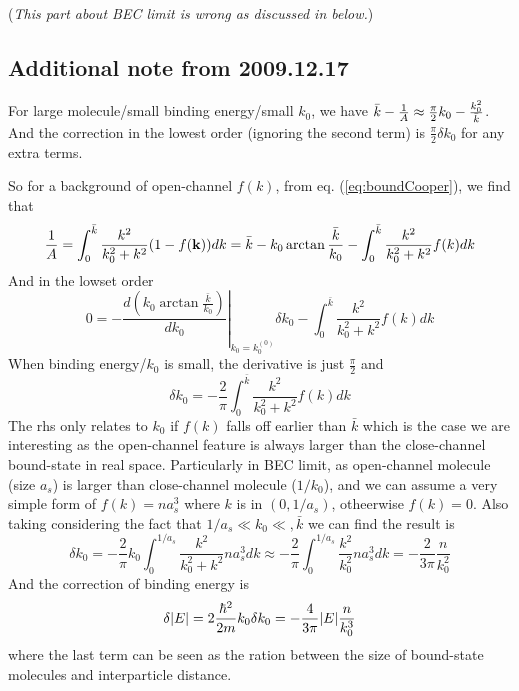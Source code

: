 (\emph{This part about BEC limit is wrong as discussed in below.})


\subsection{Additional note from 2009.12.17\label{subsec:additionalSemiCooper}}
For large molecule/small binding energy/small $k_0$, we have $\bar{k}-\frac{1}{A}\approx\frac{\pi}{2}k_0-\frac{k_0^2}{\bar{k}}$.   And the correction in the lowest order (ignoring the second term) is $\frac{\pi}{2}\delta{}k_0$ for any extra terms. 

So for a background of open-channel $f(k)$, from eq. (\ref{eq:boundCooper}), we find that 
\begin{equation*}
\frac{1}{A}=\int^{\bar{k}}_0\frac{k^2}{k_0^2+k^2}(1-f(\mathbf{k}))dk=\bar{k}-k_0\arctan\frac{\bar{k}}{k_0}-\int^{\bar{k}}_0\frac{k^2}{k_0^2+k^2}f(k)dk
\end{equation*}
And in the lowset order 
\begin{equation*}
0=-\left.\frac{d(k_0\arctan\frac{\bar{k}}{k_0})}{dk_0}\right|_{k_0=k^{(0)}_0}\delta{}k_0-\int^{\bar{k}}_0\frac{k^2}{k_0^2+k^2}f(k)dk
\end{equation*}
When binding energy/$k_0$ is small, the derivative is just $\frac{\pi}2$ and 
\begin{equation}
\delta{}k_0=-\frac{2}{\pi}\int^{\bar{k}}_0\frac{k^2}{k_0^2+k^2}f(k)dk
\end{equation}
The rhs only relates to $k_0$ if $f(k)$ falls off earlier than $\bar{k}$ which is the case we are interesting as the open-channel feature is always larger than the close-channel bound-state in real space.  Particularly in BEC limit, as open-channel molecule (size $a_s$) is larger  than close-channel molecule ($1/k_0$), and we can assume a very simple form of $f(k)=na_s^3$ where $k$ is in $(0,1/a_s)$, otheerwise $f(k)=0$.  Also taking considering the fact that $1/a_s\ll{}k_0\ll,\bar{k}$ we can find the result is
\begin{equation}
\delta{}k_0=-\frac{2}{\pi}{k_0}\int^{1/a_s}_0\frac{k^2}{k_0^2+k^2}na_s^3dk\approx-\frac{2}{\pi}\int^{1/a_s}_0\frac{k^2}{k_0^2}na_s^3dk=-\frac{2}{3\pi}\frac{n}{k^2_0}
\end{equation}
And the correction of binding energy is
\begin{equation}
\delta{}|E|=2\frac{\hbar^2}{2m}{}k_0\delta{}k_0=-\frac{4}{3\pi}|E|\frac{n}{k_0^3}
\end{equation}
where the last term can be seen as the ration between  the size of  bound-state molecules and interparticle distance. 